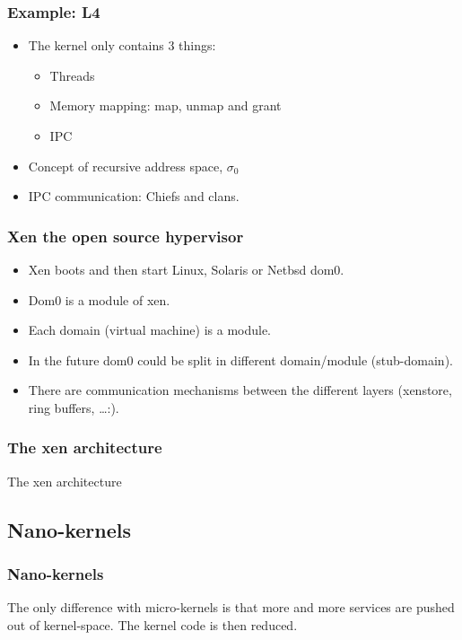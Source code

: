 \begin{frame}
  \frametitle{Example: L4}
  \begin{itemize}
        \item The kernel only contains 3 things:
        \begin{itemize}
                \item Threads
                \item Memory mapping: map, unmap and grant
                \item IPC
        \end{itemize}
        \item Concept of recursive address space, $\sigma{}_0$ 
        \item IPC communication: Chiefs and clans.
  \end{itemize}
\end{frame}

\begin{frame}
        \frametitle{Xen the open source hypervisor}
        \begin{itemize}
                \item Xen boots and then start Linux, Solaris or Netbsd dom0.
                \item Dom0 is a module of xen.
                \item Each domain (virtual machine) is a module.
                \item In the future dom0 could be split in different domain/module (stub-domain).
                \item There are communication mechanisms between the different layers (xenstore, ring buffers, \ldots:).
        \end{itemize}
\end{frame}
\begin{frame}
\frametitle{The xen architecture}
\begin{center}


The xen architecture

\end{center}
\end{frame}

%
%

\subsection{Nano-kernels}

%
%

\begin{frame}
  \frametitle{Nano-kernels}

  The only difference with micro-kernels is that more and more services are pushed out of kernel-space. The kernel code is then reduced.

\end{frame}

